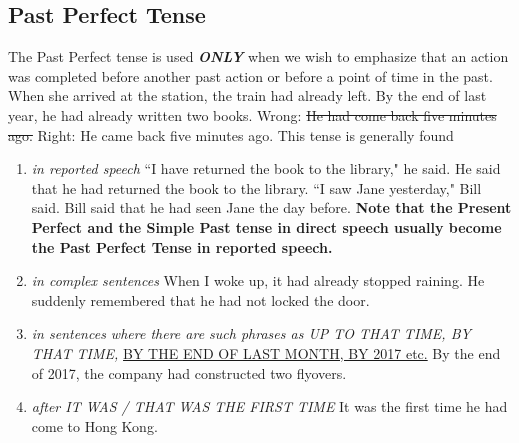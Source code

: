 \subsection{Past Perfect Tense}
The Past Perfect tense is used {\bf\it{ONLY}} when we wish to emphasize that an
action was completed before another past action or before a point of time in the
past.
\newline
\newline
When she arrived at the station, the train had already left.
\newline
By the end of last year, he had already written two books.
\newline
Wrong: \st{He had come back five minutes ago.}
\newline
Right: He came back five minutes ago.
\newline
\newline
This tense is generally found
\begin{enumerate}
    \item {\it in reported speech}
        \newline
        \newline
        ``I have returned the book to the library," he said.
        \newline
        He said that he had returned the book to the library.
        \newline
        ``I saw Jane yesterday," Bill said.
        \newline
        Bill said that he had seen Jane the day before.
        \newline
        {\bf Note that the Present Perfect and the Simple Past tense in direct
        speech usually become the Past Perfect Tense in reported speech.}
    \item {\it in complex sentences}
        \newline
        \newline
        When I woke up, it had already stopped raining.
        \newline
        He suddenly remembered that he had not locked the door.
    \item {\it in sentences where there are such phrases as UP TO THAT
        TIME, BY THAT TIME,}
        \newline
        \underline{BY THE END OF LAST MONTH, BY 2017 etc.}
        \newline
        \newline
        By the end of 2017, the company had constructed two flyovers.
    \item {\it after IT WAS / THAT WAS THE FIRST TIME}
        \newline
        \newline
        It was the first time he had come to Hong Kong.
\end{enumerate}

